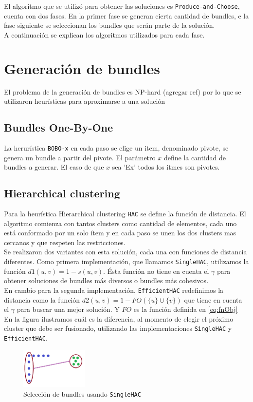 El algoritmo que se utilizó para obtener las soluciones es \texttt{Produce-and-Choose}, cuenta con 
dos fases.
En la primer fase se generan cierta cantidad de bundles, e la fase siguiente se seleccionan los 
bundles que serán parte de la solución.\\
A continuación se explican los algoritmos utilizados para cada fase.
\section{Generación de bundles}
El problema de la generación de bundles es NP-hard (agregar ref) por lo que se utilizaron heurísticas para aproximarse a una solución
\subsection{Bundles One-By-One}
La herurística \texttt{BOBO-x} en cada paso se elige un item, denominado pivote, se genera un bundle a partir del pivote. 
El parámetro $x$ define la cantidad de bundles a generar. El caso de que $x$ sea 'Ex' todos los itmes son pivotes.\\
\subsection{Hierarchical clustering}
Para la heurística Hierarchical clustering \texttt{HAC} se define la función de distancia. 
El algoritmo comienza con tantos clusters como cantidad de elementos, cada uno está conformado por un solo ítem y 
en cada paso se unen los dos clusters mas cercanos y que respeten las restricciones.\\
Se realizaron dos variantes con esta solución, cada una con funciones de distancia diferentes. 
Como primera implementación, que llamamos \texttt{SingleHAC}, utilizamos la función $d1(u,v) 
= 1 - s(u, v)$. Ésta función no tiene en cuenta el $\gamma$ para obtener soluciones de bundles más 
diversos o bundles más cohesivos.\\
En cambio para la segunda implementación, \texttt{EfficientHAC} redefinimos la distancia como la 
función $d2(u,v) = 1 - FO(\{u\} \cup \{v\})$ que tiene en cuenta el $\gamma$ para buscar una mejor 
solución. Y $FO$ es la función definida en \eqref{eq:fnObj} \\
En la figura ilustramos cuál es la diferencia, al momento de elegir el próximo cluster que debe ser 
fusionado, utilizando las implementaciones \texttt{SingleHAC} y \texttt{EfficientHAC}.
\begin{figure}[H]
  \centering
    \includegraphics[width=0.3\textwidth]{img/cluster1.png}
  \caption{Selección de bundles usando \texttt{SingleHAC}}
  \label{res:img-usingSingleHAC}
\end{figure}

